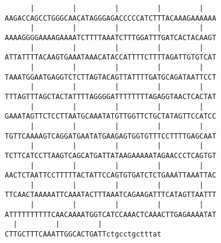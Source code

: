 \documentclass{article}
\begin{document}
\begin{Verbatim}
      |         |         |         |         |   
AAGACCAGCCTGGGCAACATAGGGAGACCCCCATCTTTACAAAGAAAAAA
      |         |         |         |         |   
AAAAGGGGAAAAGAAAATCTTTTAAATCTTTGGATTTGATCACTACAAGT
      |         |         |         |         |   
ATTATTTTACAAGTGAAATAAACATACCATTTTCTTTTAGATTGTGTCAT
      |         |         |         |         |   
TAAATGGAATGAGGTCTCTTAGTACAGTTATTTTGATGCAGATAATTCCT
      |         |         |         |         |   
TTTAGTTTAGCTACTATTTTAGGGGATTTTTTTTAGAGGTAACTCACTAT
      |         |         |         |         |   
GAAATAGTTCTCCTTAATGCAAATATGTTGGTTCTGCTATAGTTCCATCC
      |         |         |         |         |   
TGTTCAAAAGTCAGGATGAATATGAAGAGTGGTGTTTCCTTTTGAGCAAT
      |         |         |         |         |   
TCTTCATCCTTAAGTCAGCATGATTATAAGAAAAATAGAACCCTCAGTGT
      |         |         |         |         |   
AACTCTAATTCCTTTTTACTATTCCAGTGTGATCTCTGAAATTAAATTAC
      |         |         |         |         |   
TTCAACTAAAAATTCAAATACTTTAAATCAGAAGATTTCATAGTTAATTT
      |         |         |         |         |   
ATTTTTTTTTTCAACAAAATGGTCATCCAAACTCAAACTTGAGAAAATAT
  |         |         | 
CTTGCTTTCAAATTGGCACTGATTctgcctgctttat
\end{Verbatim}
\end{document}
